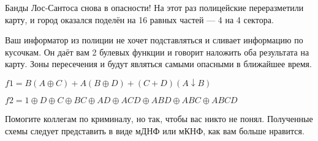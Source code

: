 \question
Банды Лос-Сантоса снова в опасности! На этот раз полицейские переразметили карту, и город оказался поделён на 16 равных частей — 4 на 4 сектора.

Ваш информатор из полиции не хочет подставляться и сливает информацию по кусочкам. Он даёт вам 2 булевых функции и говорит наложить оба результата на карту. Зоны пересечения и будут являться самыми опасными в ближайшее время.

\begin{center}
$f1=B(A\oplus C) + A(B \oplus D) + (C + D)(A \downarrow B)$

$f2=1 \oplus D \oplus C \oplus BC \oplus AD \oplus ACD \oplus ABD \oplus ABC \oplus ABCD$
\end{center}

Помогите коллегам по криминалу, но так, чтобы вас никто не понял. Полученные схемы следует представить в виде мДНФ или мКНФ, как вам больше нравится.
